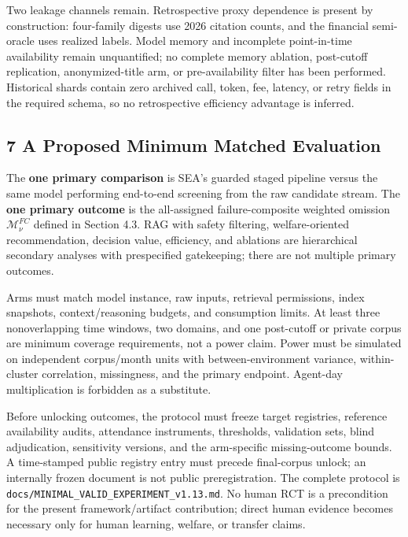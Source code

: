 \documentclass[
  11pt]{article}
\begin{document}
Two leakage channels remain. Retrospective proxy dependence is present
by construction: four-family digests use 2026 citation counts, and the
financial semi-oracle uses realized labels. Model memory and incomplete
point-in-time availability remain unquantified; no complete memory
ablation, post-cutoff replication, anonymized-title arm, or
pre-availability filter has been performed. Historical shards contain
zero archived call, token, fee, latency, or retry fields in the required
schema, so no retrospective efficiency advantage is inferred.

\subsection{7 A Proposed Minimum Matched
Evaluation}\label{a-proposed-minimum-matched-evaluation}

The \textbf{one primary comparison} is SEA's guarded staged pipeline
versus the same model performing end-to-end screening from the raw
candidate stream. The \textbf{one primary outcome} is the all-assigned
failure-composite weighted omission \(\mathcal M^{FC}_{\nu}\) defined in
Section 4.3. RAG with safety filtering, welfare-oriented recommendation,
decision value, efficiency, and ablations are hierarchical secondary
analyses with prespecified gatekeeping; there are not multiple primary
outcomes.

Arms must match model instance, raw inputs, retrieval permissions, index
snapshots, context/reasoning budgets, and consumption limits. At least
three nonoverlapping time windows, two domains, and one post-cutoff or
private corpus are minimum coverage requirements, not a power claim.
Power must be simulated on independent corpus/month units with
between-environment variance, within-cluster correlation, missingness,
and the primary endpoint. Agent-day multiplication is forbidden as a
substitute.

Before unlocking outcomes, the protocol must freeze target registries,
reference availability audits, attendance instruments, thresholds,
validation sets, blind adjudication, sensitivity versions, and the
arm-specific missing-outcome bounds. A time-stamped public registry
entry must precede final-corpus unlock; an internally frozen document is
not public preregistration. The complete protocol is
\texttt{docs/MINIMAL\_VALID\_EXPERIMENT\_v1.13.md}. No human RCT is a
precondition for the present framework/artifact contribution; direct
human evidence becomes necessary only for human learning, welfare, or
transfer claims.
\end{document}
